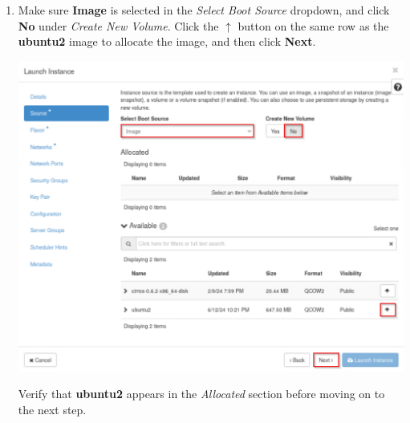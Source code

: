 \documentclass[letterpaper, 12pt]{article}
\begin{document}
\begin{enumerate}
    \item Make sure \textbf{Image} is selected in the \textit{Select Boot Source} dropdown, and click \textbf{No} under
    \textit{Create New Volume}. Click the $\uparrow$ button on the same row as the \textbf{ubuntu2} image to allocate the
    image, and then click \textbf{Next}.

    \begin{center}
        \includegraphics[width=\linewidth]{images/part4/step4.png}
    \end{center}

    \begin{stopbox}
        Verify that \textbf{ubuntu2} appears in the \textit{Allocated} section before moving on to the next step.
    \end{stopbox}


\end{enumerate}
\end{document}
